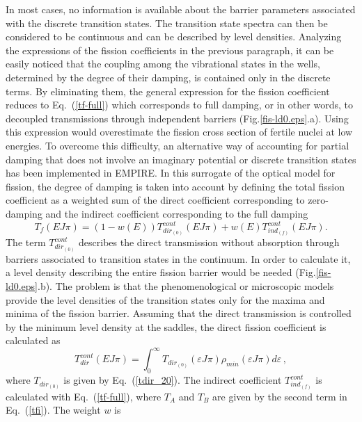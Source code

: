 In most cases, no information is available about the barrier
parameters associated with the discrete transition states. The
transition state spectra can then be considered to be continuous and
can be described
by level densities. Analyzing the expressions of the fission coefficients in
the previous paragraph, it can be easily noticed that the coupling among the
vibrational states in the wells, determined by the degree of their damping,
is contained only in the discrete terms. By eliminating them, the general
expression for the fission coefficient reduces to Eq.~(\ref{tf-full}) which
corresponds to full damping, or in other words, to decoupled transmissions
through independent barriers (Fig.\ref{fis-ld0.eps}.a). Using this expression
would overestimate the fission cross section of fertile nuclei at low energies.
To overcome this difficulty, an alternative way of
accounting for partial damping that does not involve an imaginary potential
or discrete transition states  has been implemented in EMPIRE.
In this surrogate of the optical model for
fission, the degree of damping is taken into account by defining the total
fission coefficient as a weighted sum of the direct coefficient
corresponding to zero-damping and the indirect coefficient corresponding to
the full damping
\begin{equation}
T_{f}(EJ\pi )=(1-w(E))T_{dir_{(0)}}^{cont}(EJ\pi
)+w(E)T_{ind_{(f)}}^{cont}(EJ\pi ).  \label{tfsurr}
\end{equation}%
The term $T_{dir_{(0)}}^{cont}$ describes the direct transmission without
absorption through barriers associated to transition states in the continuum. In
order to calculate it, a level density describing the entire fission barrier
would be needed (Fig.\ref{fis-ld0.eps}.b). The problem is that the
phenomenological or microscopic models provide the level densities of the
transition states only for the maxima and minima of the fission barrier.
Assuming that the direct transmission is controlled by the minimum level
density at the saddles, the direct fission coefficient is calculated as
\begin{equation}
T_{dir}^{cont}(EJ\pi )=\int_{0}^{\infty }T_{dir_{(0)}}(\varepsilon J\pi
)\rho _{min}(\varepsilon J\pi )d\varepsilon\,,
\end{equation}%
where $T_{dir_{(0)}}$ is given by Eq.~(\ref{tdir_20}). The indirect coefficient
$T_{ind_{(f)}}^{cont}$ is calculated with Eq.~(\ref{tf-full}), where $T_{A}$
and $T_{B}$ are given by the second term in Eq.~(\ref{tfi}). The weight $w$ is
